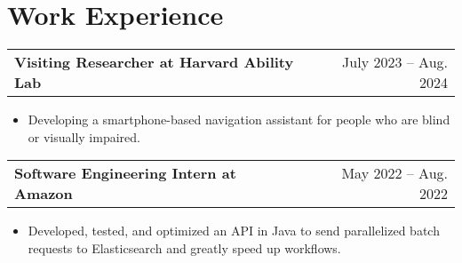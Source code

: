 \documentclass[a4paper,12pt]{article}
\makeatletter
\newenvironment{joblong}[2]
    {
    \begin{tabularx}{\linewidth}{@{}l X r@{}}
    \textbf{#1} & \hfill &  #2 \\[3.75pt]
    \end{tabularx}
    \begin{minipage}[t]{\linewidth}
    \begin{itemize}[nosep,after=\strut, leftmargin=1em, itemsep=3pt,label=--]
    }
    {
    \end{itemize}
    \end{minipage}    
    }
\makeatother
\begin{document}




\vspace{-10pt}
\section{Work Experience}

\begin{joblong}{Visiting Researcher at Harvard Ability Lab}{July 2023 – Aug. 2024}
\item Developing a smartphone-based navigation assistant for people who are blind or visually impaired.
\end{joblong}

\begin{joblong}{Software Engineering Intern at Amazon}{May 2022 – Aug. 2022}
\item Developed, tested, and optimized an API in Java to send parallelized batch requests to Elasticsearch and greatly speed up workflows.
\end{joblong}
\end{document}
